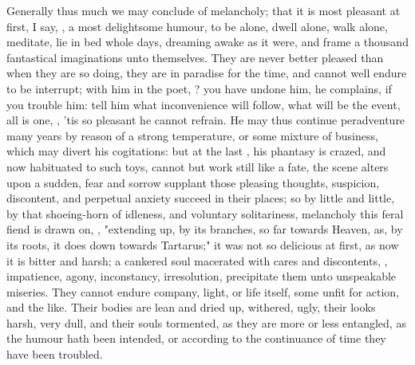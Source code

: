 {Generally thus much we may conclude of melancholy; that it is
most pleasant at first, I say, , a most delightsome humour, to be alone, dwell
alone, walk alone, meditate, lie in bed whole days, dreaming awake as it were,
and frame a thousand fantastical imaginations unto themselves. They are never
better pleased than when they are so doing, they are in paradise for the time,
and cannot well endure to be interrupt; with him in the poet,
? you have
undone him, he complains, if you trouble him: tell him what inconvenience will
follow, what will be the event, all is one, ,
'tis so pleasant he cannot refrain. He may thus continue
peradventure many years by reason of a strong temperature, or some mixture of
business, which may divert his cogitations: but at the last , his phantasy is crazed, and now habituated to such toys, cannot
but work still like a fate, the scene alters upon a sudden, fear and sorrow
supplant those pleasing thoughts, suspicion, discontent, and perpetual anxiety
succeed in their places; so by little and little, by that shoeing-horn of
idleness, and voluntary solitariness, melancholy this feral fiend is drawn on,
, "extending up, by its branches, so far towards Heaven, as,
by its roots, it does down towards Tartarus;" it was not so delicious at first,
as now it is bitter and harsh; a cankered soul macerated with cares and
discontents, , impatience, agony, inconstancy, irresolution,
precipitate them unto unspeakable miseries. They cannot endure company, light,
or life itself, some unfit for action, and the like. Their
bodies are lean and dried up, withered, ugly, their looks harsh, very dull, and
their souls tormented, as they are more or less entangled, as the humour hath
been intended, or according to the continuance of time they have been troubled.

}
